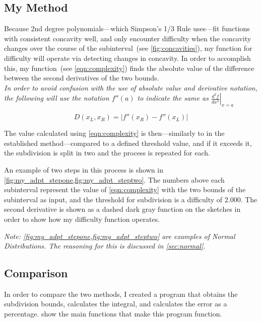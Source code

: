 \documentclass{paper}
\begin{document}
\subsection{My Method}
\label{sec:my_method}
Because 2nd degree polynomials---which Simpson's 1/3 Rule uses---fit functions with consistent concavity well, and only encounter difficulty when the concavity changes over the course of the subinterval~(see \cref{fig:concavities}), my function for difficulty will operate via detecting changes in concavity.
In order to accomplish this, my function~(see \cref{eqn:complexity}) finds the absolute value of the difference between the second derivatives of the two bounds.\\
\emph{In order to avoid confusion with the use of absolute value and derivative notation, the following will use the notation \(f''(a)\) to indicate the same as \(\left.\frac{d^2f}{dx^2}\right|_{x=a}\)}



\begin{equation}
    \label{eqn:complexity}
    D(x_L, x_R) = \left|f''(x_R) - f''(x_L)\right|
\end{equation}

The value calculated using \cref{eqn:complexity} is then---similarly to in the established method---compared to a defined threshold value, and if it exceeds it, the subdivision is split in two and the process is repeated for each.

An example of two steps in this process is shown in \cref{fig:my_adpt_stepone,fig:my_adpt_steptwo}.
The numbers above each subinterval represent the value of \cref{eqn:complexity} with the two bounds of the subinterval as input, and the threshold for subdivision is a difficulty of \(2.000\).
The second derivative is shown as a dashed dark gray function on the sketches in order to show how my difficulty function operates.

\emph{%
Note: \cref{fig:my_adpt_stepone,fig:my_adpt_steptwo} are examples of Normal Distributions.
The reasoning for this is discussed in \cref{sec:normal}.%
}





\subsection{Comparison}
\label{sec:comparison}
In order to compare the two methods, I created a program that obtains the subdivision bounds, calculates the integral, and calculates the error as a percentage.
 show the main functions that make this program function.
\end{document}
